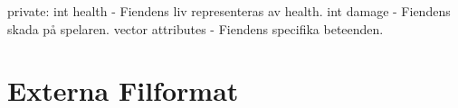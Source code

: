 \documentclass{TDP005mall}
\begin{document}
private:
int health - Fiendens liv representeras av health.
int damage - Fiendens skada på spelaren.
vector attributes - Fiendens specifika beteenden.


\section{Externa Filformat}

\newpage
\printbibliography
\end{document}

